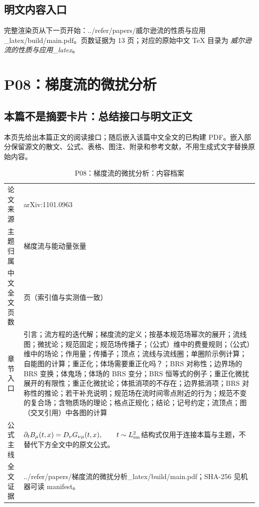 \documentclass[UTF8,11pt,oneside]{ctexbook}
\begin{document}
\section*{明文内容入口}
\noindent 完整渲染页从下一页开始：../\allowbreak{}refer/\allowbreak{}papers/\allowbreak{}威尔逊流的性质与应用\_\allowbreak{}latex/\allowbreak{}build/\allowbreak{}main.pdf。页数证据为 13 页；对应的原始中文 TeX 目录为 \emph{威尔逊流的性质与应用\_latex}。
\clearpage

\clearpage

\chapter{P08：梯度流的微扰分析}
\section*{本篇不是摘要卡片：总结接口与明文正文}
本页先给出本篇正文的阅读接口；随后嵌入该篇中文全文的已构建 PDF。嵌入部分保留源文的散文、公式、表格、图注、附录和参考文献，不用生成式文字替换原始内容。
\begin{table}[htbp]
  \centering
  \caption{P08：梯度流的微扰分析：内容档案}
  \small
  \begin{tabularx}{0.96\textwidth}{@{}p{3.3cm}>{\raggedright\arraybackslash}X@{}}
    \toprule
    论文来源 & arXiv:1101.0963 \\
    主题归属 & 梯度流与能动量张量 \\
    中文全文页数 & 19 页（索引值与实测值一致） \\
    章节入口 & 引言；流方程的迭代解；梯度流的定义；按基本规范场幂次的展开；流线图；微扰论；规范固定；规范场传播子；（公式）维中的费曼规则；（公式）维中的场论；作用量；传播子；顶点；流线与流线圈；单圈阶示例计算；自能图的计算；重正化；体场需要重正化吗？；BRS 对称性；边界场的 BRS 变换；体鬼场；体场的 BRS 变分；BRS 恒等式的例子；重正化微扰展开的有限性；重正化微扰论；体抵消项的不存在；边界抵消项；BRS 对称性的推论；若干补充说明；规范场在流时间零点附近的行为；规范不变的复合场；含物质场的理论；格点正规化；结论；记号约定；流顶点；图（交叉引用）中各图的计算 \\
    公式主线 & $\partial_t B_\mu(t,x)=D_\nu G_{\nu\mu}(t,x),\qquad t\sim L_{\rm sm}^{2}$\newline\scriptsize 结构式仅用于连接本篇与主题，不替代下方全文中的原文公式。 \\
    全文证据 & ../\allowbreak{}refer/\allowbreak{}papers/\allowbreak{}梯度流的微扰分析\_\allowbreak{}latex/\allowbreak{}build/\allowbreak{}main.pdf；SHA-256 见机器可读 manifest。 \\
    \bottomrule
  \end{tabularx}
\end{table}
\end{document}
